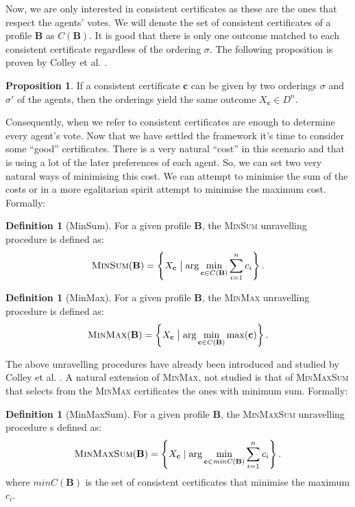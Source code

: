 \documentclass[11pt,a4paper, titlepage]{article}
\theoremstyle{definition}
\newtheorem{definition}[theorem]{Definition}
\newtheorem{proposition}[theorem]{Proposition}
\let\vec\mathbf
\begin{document}
Now, we are only interested in consistent certificates as these are the ones that respect the agents' votes. We will denote the set of consistent certificates of a profile $\mathbf{B}$ as $C(\mathbf{B})$.
It is good that there is only one outcome matched to each consistent certificate regardless of the ordering $\sigma$. The following proposition is proven by Colley et al. \cite{grandi}.

\begin{proposition}
    If a consistent certificate $\mathbf{c}$ can be given by two orderings $\sigma$ and $\sigma'$ of the agents, then the orderings yield the same outcome $X_\mathbf{c} \in D^n$.
\end{proposition}

Consequently, when we refer to consistent certificates are enough to determine every agent's vote. 
Now that we have settled the framework it's time to consider some ``good'' certificates. 
There is a very natural ``cost'' in this scenario and that is using a lot of the later preferences of each agent. 
So, we can set two very natural ways of minimising this cost. 
We can attempt to minimise the sum of the costs or in a more egalitarian spirit attempt to minimise the maximum cost. 
Formally:

\begin{definition}[MinSum]
    For a given profile $\mathbf{B}$, the \textsc{MinSum} unravelling procedure is defined as:
    \[
        \textsc{MinSum}(\mathbf{B}) = 
        \left\{X_{\mathbf{c}} \bigm| \mathrm{arg} \min_{\mathbf{c} \in C(\mathbf{B})} \sum_{i=1}^n c_i\right\}.
    \]
\end{definition}

\begin{definition}[MinMax]
    For a given profile $\mathbf{B}$, the \textsc{MinMax} unravelling procedure is defined as:
    \[
        \textsc{MinMax}(\mathbf{B}) = \left\{X_{\mathbf{c}} \bigm| \mathrm{arg} \min_{\mathbf{c} \in C(\mathbf{B})} \max (\mathbf{c}) \right\}.
    \]
\end{definition}

The above unravelling procedures have already been introduced and studied by Colley et al. \cite{grandi}. 
A natural extension of \textsc{MinMax}, not studied is that of \textsc{MinMaxSum} that selects from the \textsc{MinMax} certificates the ones with minimum sum. 
Formally:

\begin{definition}[MinMaxSum]
    For a given profile $\mathbf{B}$, the \textsc{MinMaxSum} unravelling procedure s defined as:
    \[
        \textsc{MinMaxSum}(\mathbf{B}) =  \left\{ X_{\mathbf{c}}\mid \arg  \min_{\vec{c} \in \mathit{minC}(\mathbf{B})} \sum_{i=1}^n c_i \right\}.
    \]
    where $\mathit{minC}(\vec{B})$ is the set of consistent certificates that minimise the maximum $c_i$. 
\end{definition}
\end{document}
